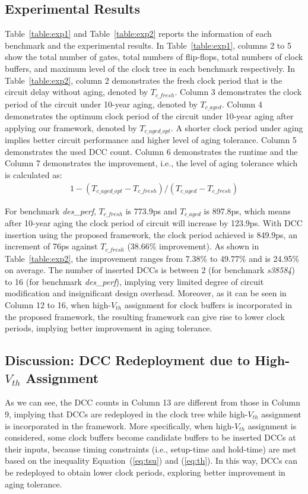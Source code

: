 \subsection{Experimental Results}
Table~\ref{table:exp1} and Table~\ref{table:exp2} reports the information of each benchmark and the experimental results. In Table~\ref{table:exp1}, columns 2 to 5 show the total number of gates, total numbers of flip-flops, total numbers of clock buffers, and maximum level of the clock tree in each benchmark respectively. In Table~\ref{table:exp2}, column 2 demonstrates the fresh clock period that is the circuit delay without aging, denoted by $T_{c\_fresh}$. Column 3 demonstrates the clock period of the circuit under 10-year aging, denoted by $T_{c\_aged}$. Column 4 demonstrates the optimum clock period of the circuit under 10-year aging after applying our framework, denoted by $T_{c\_aged\_opt}$. A shorter clock period under aging implies better circuit performance and higher level of aging tolerance. Column 5 demonstrates the used DCC count. Column 6 demonstrates the runtime and the Column 7 demonstrates the improvement, i.e., the level of aging tolerance which is calculated as:
\begin{gather*}
1 - (T_{c\_aged\_opt} - T_{c\_fresh}) / (T_{c\_aged} - T_{c\_fresh})
\end{gather*}

For benchmark \textit{des\_perf}, $T_{c\_fresh}$ is 773.9ps and $T_{c\_aged}$ is 897.8ps, which means after 10-year aging the clock period of circuit will increase by 123.9ps. With DCC insertion using the proposed framework, the clock period achieved is 849.9ps, an increment of 76ps against $T_{c\_fresh}$ (38.66\% improvement). As shown in Table~\ref{table:exp2}, the improvement ranges from 7.38\% to 49.77\% and is 24.95\% on average. \iffalse As shown in Table~\ref{table:exp1}.\fi The number of inserted DCCs is between 2 (for benchmark \textit{s38584}) to 16 (for benchmark \textit{des\_perf}), implying very limited degree of circuit modification and insignificant design overhead. Moreover, as it can be seen in Column 12 to 16, when high-$V_{th}$ assignment for clock buffers is incorporated in the proposed framework, the resulting framework can give rise to lower clock periods, implying better improvement in aging tolerance. 

\subsection{Discussion: DCC Redeployment due to High-$V_{th}$ Assignment}
As we can see, the DCC counts in Column 13 are different from those in Column 9, implying that DCCs are redeployed in the clock tree while high-$V_{th}$ assignment is incorporated in the framework. More specifically, when high-$V_{th}$ assignment is considered, some clock buffers become candidate buffers to be inserted DCCs at their inputs, because timing constraints (i.e., setup-time and hold-time) are met based on the inequality Equation~(\ref{eq:tsu}) and (\ref{eq:th}). In this way, DCCs can be redeployed to obtain lower clock periods, exploring better improvement in aging tolerance.


